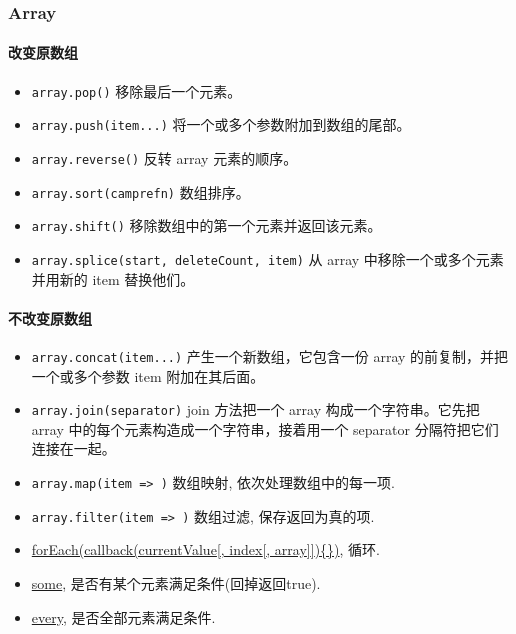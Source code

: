 \subsubsection{Array}\label{array}

\paragraph{改变原数组}\label{ux6539ux53d8ux539fux6570ux7ec4}

\begin{itemize}
\tightlist
\item
  \lstinline!array.pop()! 移除最后一个元素。
\item
  \lstinline!array.push(item...)! 将一个或多个参数附加到数组的尾部。
\item
  \lstinline!array.reverse()! 反转 array 元素的顺序。
\item
  \lstinline!array.sort(camprefn)! 数组排序。
\item
  \lstinline!array.shift()! 移除数组中的第一个元素并返回该元素。
\item
  \lstinline!array.splice(start, deleteCount, item)! 从 array
  中移除一个或多个元素并用新的 item 替换他们。
\end{itemize}

\paragraph{不改变原数组}\label{ux4e0dux6539ux53d8ux539fux6570ux7ec4}

\begin{itemize}
\tightlist
\item
  \lstinline!array.concat(item...)! 产生一个新数组，它包含一份 array
  的前复制，并把一个或多个参数 item 附加在其后面。
\item
  \lstinline!array.join(separator)! join 方法把一个 array
  构成一个字符串。它先把 array 中的每个元素构造成一个字符串，接着用一个
  separator 分隔符把它们连接在一起。
\item
  \lstinline!array.map(item => )! 数组映射, 依次处理数组中的每一项.
\item
  \lstinline!array.filter(item => )! 数组过滤, 保存返回为真的项.
\item
  \href{https://developer.mozilla.org/en-US/docs/Web/JavaScript/Reference/Global_Objects/Array/forEach}{forEach(callback(currentValue{[},
  index{[}, array{]}{]})\{\})}, 循环.
\item
  \href{https://developer.mozilla.org/en-US/docs/Web/JavaScript/Reference/Global_Objects/Array/some}{some},
  是否有某个元素满足条件(回掉返回true).
\item
  \href{https://developer.mozilla.org/en-US/docs/Web/JavaScript/Reference/Global_Objects/Array/every}{every},
  是否全部元素满足条件.
\end{itemize}

